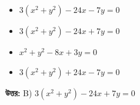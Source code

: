 \documentclass[12pt, a4paper]{article}
\begin{document}
\begin{itemize}[label={}, leftmargin=1cm, itemsep=0.5em]
    \item[\textbf{A)}] $3(x^2 + y^2) - 24x - 7y = 0$
    \item[\textbf{B)}] $3(x^2 + y^2) - 24x + 7y = 0$
    \item[\textbf{C)}] $x^2 + y^2 - 8x + 3y = 0$
    \item[\textbf{D)}] $3(x^2 + y^2) + 24x - 7y = 0$
\end{itemize}

\vspace{0.5em}
\begin{tcolorbox}[answerbox]
    \textbf{\color{success} উত্তর:} B) $3(x^2 + y^2) - 24x + 7y = 0$
\end{tcolorbox}
\vspace{1em}
\end{document}
